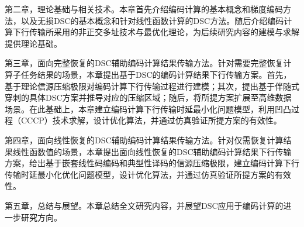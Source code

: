 第二章，理论基础与相关技术。本章首先介绍编码计算的基本概念和梯度编码方法，以及无损DSC的基本概念和针对线性函数计算的DSC方法。随后介绍编码计算下行传输所采用的非正交多址技术与最优化理论，为后续研究内容的建模与求解提供理论基础。

第三章，面向完整恢复的DSC辅助编码计算结果传输方法。针对需要完整恢复计算子任务结果的场景，本章提出基于DSC的编码计算结果下行传输方案。首先，基于理论信源压缩极限对编码计算下行传输过程进行建模；其次，提出基于伴随式穿刺的具体DSC方案并推导对应的压缩区域；随后，将所提方案扩展至高维数据场景。在此基础上，本章建立编码计算下行传输时延最小化问题模型，利用凹凸过程（CCCP）技术求解，设计优化算法，并通过仿真验证所提方案的有效性。

第四章，面向线性恢复的DSC辅助编码计算结果传输方法。针对仅需恢复计算结果线性函数值的场景，本章提出面向线性恢复的DSC辅助编码计算结果下行传输方案，给出基于嵌套线性码编码和典型性译码的信源压缩极限，建立编码计算下行传输时延最小化优化问题模型，设计优化算法，并通过仿真验证所提方案的有效性。

第五章，总结与展望。本章总结全文研究内容，并展望DSC应用于编码计算的进一步研究方向。

